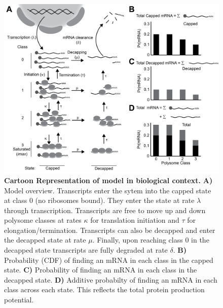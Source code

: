 \documentclass[10pt,letterpaper]{article}
\begin{document}
\begin{figure}[!h]
\begin{center}
\includegraphics[width=120mm]{Images/Figure1_biomodel_V3.png}
\caption{{\bf Cartoon Representation of model in biological context.} 
{\bf A)} Model overview. Transcripts enter the sytem into the capped state at class 0 (no ribosomes bound). They enter the state at rate $\lambda$ through transcription. Transcripts are free to move up and down polysome classes at rates $\kappa$ for translation initiation and $\tau$ for elongation/termination. Transcripts can also be decapped and enter the decapped state at rate $\mu$. Finally, upon reaching class 0 in the decapped state transcripts are fully degraded at rate $\delta$. {\bf B)} Probability (CDF) of finding an mRNA in each class in the capped state. {\bf C)} Probability of finding an mRNA in each class in the decapped state. {\bf D)} Additive probabilty of finding an mRNA in each class across each state. This reflects the total protein production potential.}
\label{fig1}
\end{center}
\end{figure}
\end{document}
